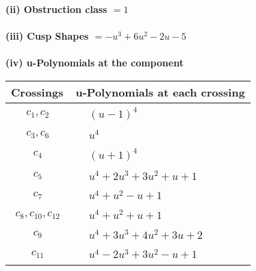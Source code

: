 \documentclass[1p]{elsarticle_modified}
\theoremstyle{definition}
\begin{document}
\flushleft \textbf{(ii) Obstruction class $= 1$}\\~\\
\flushleft \textbf{(iii) Cusp Shapes $= - u^3+6 u^2-2 u-5$}\\~\\
\newpage\renewcommand{\arraystretch}{1}
\flushleft \textbf{(iv) u-Polynomials at the component}\newline \\
\begin{tabular}{m{50pt}|m{274pt}}
Crossings & \hspace{64pt}u-Polynomials at each crossing \\
\hline $$\begin{aligned}c_{1},c_{2}\end{aligned}$$&$\begin{aligned}
&(u-1)^4
\end{aligned}$\\
\hline $$\begin{aligned}c_{3},c_{6}\end{aligned}$$&$\begin{aligned}
&u^4
\end{aligned}$\\
\hline $$\begin{aligned}c_{4}\end{aligned}$$&$\begin{aligned}
&(u+1)^4
\end{aligned}$\\
\hline $$\begin{aligned}c_{5}\end{aligned}$$&$\begin{aligned}
&u^4+2 u^3+3 u^2+u+1
\end{aligned}$\\
\hline $$\begin{aligned}c_{7}\end{aligned}$$&$\begin{aligned}
&u^4+u^2- u+1
\end{aligned}$\\
\hline $$\begin{aligned}c_{8},c_{10},c_{12}\end{aligned}$$&$\begin{aligned}
&u^4+u^2+u+1
\end{aligned}$\\
\hline $$\begin{aligned}c_{9}\end{aligned}$$&$\begin{aligned}
&u^4+3 u^3+4 u^2+3 u+2
\end{aligned}$\\
\hline $$\begin{aligned}c_{11}\end{aligned}$$&$\begin{aligned}
&u^4-2 u^3+3 u^2- u+1
\end{aligned}$\\
\hline
\end{tabular}\\~\\
\end{document}
